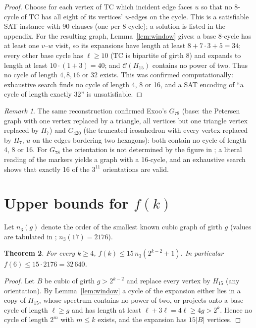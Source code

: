 \documentclass[11pt]{article}
\newtheorem{theorem}{Theorem}[section]
\theoremstyle{remark}
\newtheorem{remark}[theorem]{Remark}
\theoremstyle{definition}
\newcommand{\Cyc}{\mathcal{C}}
\newcommand{\TC}{\mathrm{TC}}
\begin{document}
\begin{proof}
Choose for each vertex of $\TC$ which incident edge faces $u$ so that no 8-cycle of $\TC$ has all eight of its vertices' $u$-edges on the cycle. This is a satisfiable SAT instance with 90 clauses (one per 8-cycle); a solution is listed in the appendix. For the resulting graph, Lemma~\ref{lem:window} gives: a base 8-cycle has at least one $v$--$w$ visit, so its expansions have length at least $8+7\cdot 3+5=34$; every other base cycle has $\ell\ge 10$ ($\TC$ is bipartite of girth 8) and expands to length at least $10\cdot(1+3)=40$; and $\Cyc(H_{15})$ contains no power of two. Thus no cycle of length $4,8,16$ or $32$ exists. This was confirmed computationally: exhaustive search finds no cycle of length 4, 8 or 16, and a SAT encoding of ``a cycle of length exactly 32'' is unsatisfiable.
\end{proof}

\begin{remark}
The same reconstruction confirmed Exoo's $G_{78}$ (base: the Petersen graph with one vertex replaced by a triangle, all vertices but one triangle vertex replaced by $H_7$) and $G_{420}$ (the truncated icosahedron with every vertex replaced by $H_7$, $u$ on the edges bordering two hexagons): both contain no cycle of length 4, 8 or 16. For $G_{78}$ the orientation is not determined by the figure in \cite{Exoo}; a literal reading of the markers yields a graph with a 16-cycle, and an exhaustive search shows that exactly 16 of the $3^{11}$ orientations are valid.
\end{remark}

\section{Upper bounds for \texorpdfstring{$f(k)$}{f(k)}}

Let $n_3(g)$ denote the order of the smallest known cubic graph of girth $g$ (values are tabulated in \cite{ExooJajcay}; $n_3(17)=2176$).

\begin{theorem}\label{thm:B}
For every $k\ge 4$, $f(k)\le 15\,n_3(2^{k-2}+1)$. In particular $f(6)\le 15\cdot 2176=32\,640$.
\end{theorem}

\begin{proof}
Let $B$ be cubic of girth $g>2^{k-2}$ and replace every vertex by $H_{15}$ (any orientation). By Lemma~\ref{lem:window} a cycle of the expansion either lies in a copy of $H_{15}$, whose spectrum contains no power of two, or projects onto a base cycle of length $\ell\ge g$ and has length at least $\ell+3\ell=4\ell\ge 4g>2^k$. Hence no cycle of length $2^m$ with $m\le k$ exists, and the expansion has $15|B|$ vertices.
\end{proof}
\end{document}
